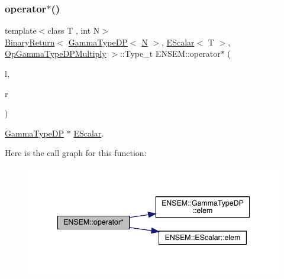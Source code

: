 \subsubsection{\texorpdfstring{operator$\ast$()}{operator*()}\hspace{0.1cm}{\footnotesize\ttfamily [8/9]}}
{\footnotesize\ttfamily template$<$class T , int N$>$ \\
\mbox{\hyperlink{structENSEM_1_1BinaryReturn}{Binary\+Return}}$<$ \mbox{\hyperlink{classENSEM_1_1GammaTypeDP}{Gamma\+Type\+DP}}$<$ \mbox{\hyperlink{operator__name__util_8cc_a7722c8ecbb62d99aee7ce68b1752f337}{N}} $>$, \mbox{\hyperlink{classENSEM_1_1EScalar}{E\+Scalar}}$<$ T $>$, \mbox{\hyperlink{structENSEM_1_1OpGammaTypeDPMultiply}{Op\+Gamma\+Type\+D\+P\+Multiply}} $>$\+::Type\+\_\+t E\+N\+S\+E\+M\+::operator$\ast$ (\begin{DoxyParamCaption}\item[{const \mbox{\hyperlink{classENSEM_1_1GammaTypeDP}{Gamma\+Type\+DP}}$<$ \mbox{\hyperlink{operator__name__util_8cc_a7722c8ecbb62d99aee7ce68b1752f337}{N}} $>$ \&}]{l,  }\item[{const \mbox{\hyperlink{classENSEM_1_1EScalar}{E\+Scalar}}$<$ T $>$ \&}]{r }\end{DoxyParamCaption})\hspace{0.3cm}{\ttfamily [inline]}}



\mbox{\hyperlink{classENSEM_1_1GammaTypeDP}{Gamma\+Type\+DP}} $\ast$ \mbox{\hyperlink{classENSEM_1_1EScalar}{E\+Scalar}}. 

Here is the call graph for this function\+:
\nopagebreak
\begin{figure}[H]
\begin{center}
\leavevmode
\includegraphics[width=343pt]{d4/dca/group__escalar_ga54ffca46c333d9dad30043eb6cef6299_cgraph}
\end{center}
\end{figure}
\mbox{\label{group__escalar_ga546f1e55f2e4eda7a887fbf4fcaa177f}} 
